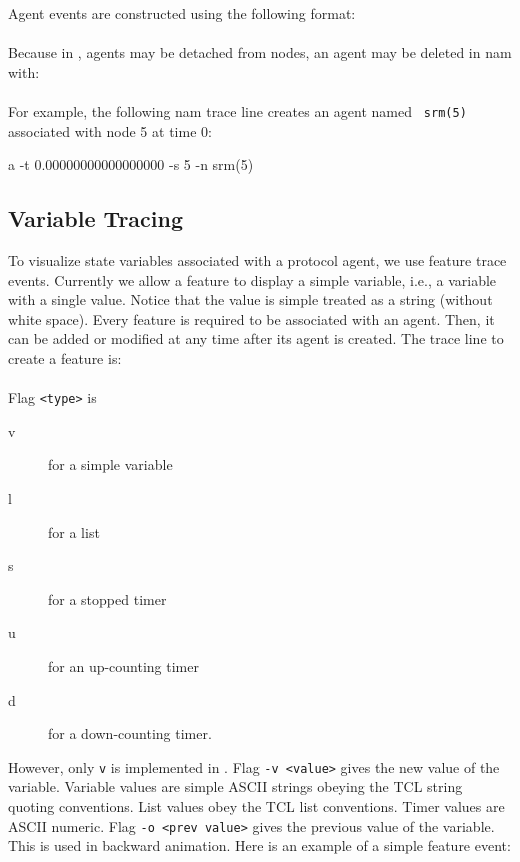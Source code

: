 Agent events are constructed using the following format:\\
\\
Because in \ns, agents may be detached from nodes, an agent may be 
deleted in nam with:\\
\\
For example, the following nam trace line creates an agent named {\tt
  srm(5)} associated with node 5 at time 0:
\begin{program}
a -t 0.00000000000000000 -s 5 -n srm(5)
\end{program}

\subsection{Variable Tracing}

To visualize state variables associated with a protocol agent, we use
feature trace events.
Currently we allow a feature to display a simple variable, i.e., a
variable with a single value. 
Notice that the value is simple treated as a string (without
white space).
Every feature is required to be associated with an agent. 
Then, it can be added or modified at any time after its agent is created.
The trace line to create a feature is:\\
\\
Flag {\tt <type>} is 
\begin{description}
\item[v] for a simple variable
\item[l] for a list
\item[s] for a stopped timer
\item[u] for an up-counting timer
\item[d] for a down-counting timer.
\end{description}

However, only {\tt v} is implemented in \ns. 
Flag {\tt -v <value>} gives the new value of the variable. 
Variable values are simple ASCII strings obeying the TCL string
quoting conventions. 
List values obey the TCL list conventions. 
Timer values are ASCII numeric. 
Flag {\tt -o <prev value>} gives the previous value of the variable. 
This is used in backward animation.
Here is an example of a simple feature event:\\
\\

